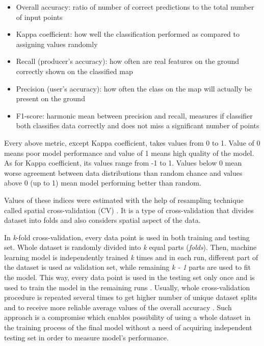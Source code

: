 \documentclass{amuthesis}
\begin{document}
\begin{itemize}
\item
  Overall accuracy: ratio of number of correct predictions to the total
  number of input points
\item
  Kappa coefficient: how well the classification performed as compared
  to assigning values randomly
\item
  Recall (producer's accuracy): how often are real features on the
  ground correctly shown on the classified map
\item
  Precision (user's accuracy): how often the class on the map will
  actually be present on the ground
\item
  F1-score: harmonic mean between precision and recall, measures if
  classifier both classifies data correctly and does not miss a
  significant number of points
\end{itemize}

Every above metric, except Kappa coefficient, takes values from 0 to 1.
Value of 0 means poor model performance and value of 1 means high
quality of the model. As for Kappa coefficient, its values range from -1
to 1. Values below 0 mean worse agreement between data distributions
than random chance and values above 0 (up to 1) mean model performing
better than random.

Values of these indices were estimated with the help of resampling
technique called spatial cross-validation (CV)
\autocite{lovelace_geocomputation_2019}. It is a type of
cross-validation that divides dataset into folds and also considers
spatial aspect of the data.

In \emph{k}-fold cross-validation, every data point is used in both
training and testing set. Whole dataset is randomly divided into
\emph{k} equal parts (\emph{folds}). Then, machine learning model is
independently trained \emph{k} times and in each run, different part of
the dataset is used as validation set, while remaining \emph{k - 1}
parts are used to fit the model. This way, every data point is used in
the testing set only once and is used to train the model in the
remaining runs \autocite{jiao_performance_2016}. Usually, whole
cross-validation procedure is repeated several times to get higher
number of unique dataset splits and to receive more reliable average
values of the overall accuracy \autocite{varga_validation_2021}. Such
approach is a compromise which enables possibility of using a whole
dataset in the training process of the final model without a need of
acquiring independent testing set in order to measure model's
performance.
\end{document}
